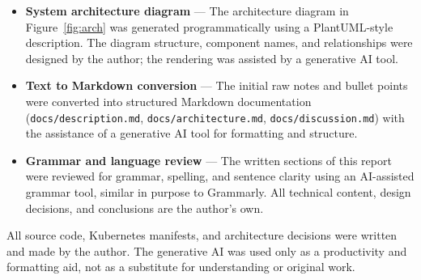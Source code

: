 \documentclass[12pt,a4paper]{article}
\begin{document}
\begin{itemize}
    \item \textbf{System architecture diagram} --- The architecture diagram in Figure~\ref{fig:arch} was generated programmatically using a PlantUML-style description. The diagram structure, component names, and relationships were designed by the author; the rendering was assisted by a generative AI tool.

    \item \textbf{Text to Markdown conversion} --- The initial raw notes and bullet points were converted into structured Markdown documentation (\texttt{docs/description.md}, \texttt{docs/architecture.md}, \texttt{docs/discussion.md}) with the assistance of a generative AI tool for formatting and structure.

    \item \textbf{Grammar and language review} --- The written sections of this report were reviewed for grammar, spelling, and sentence clarity using an AI-assisted grammar tool, similar in purpose to Grammarly. All technical content, design decisions, and conclusions are the author's own.
\end{itemize}

All source code, Kubernetes manifests, and architecture decisions were written and made by the author. The generative AI was used only as a productivity and formatting aid, not as a substitute for understanding or original work.
\end{document}
